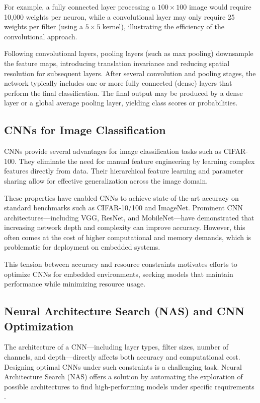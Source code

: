 For example, a fully connected layer processing a \(100 \times 100\) image would require 10,000 weights per neuron, while a convolutional layer may only require 25 weights per filter (using a \(5 \times 5\) kernel), illustrating the efficiency of the convolutional approach.

Following convolutional layers, pooling layers (such as max pooling) downsample the feature maps, introducing translation invariance and reducing spatial resolution for subsequent layers. After several convolution and pooling stages, the network typically includes one or more fully connected (dense) layers that perform the final classification. The final output may be produced by a dense layer or a global average pooling layer, yielding class scores or probabilities.

\subsection{CNNs for Image Classification}

CNNs provide several advantages for image classification tasks such as CIFAR-100. They eliminate the need for manual feature engineering by learning complex features directly from data. Their hierarchical feature learning and parameter sharing allow for effective generalization across the image domain.

These properties have enabled CNNs to achieve state-of-the-art accuracy on standard benchmarks such as CIFAR-10/100 and ImageNet. Prominent CNN architectures---including VGG, ResNet, and MobileNet---have demonstrated that increasing network depth and complexity can improve accuracy. However, this often comes at the cost of higher computational and memory demands, which is problematic for deployment on embedded systems.

This tension between accuracy and resource constraints motivates efforts to optimize CNNs for embedded environments, seeking models that maintain performance while minimizing resource usage.

\subsection{Neural Architecture Search (NAS) and CNN Optimization}

The architecture of a CNN---including layer types, filter sizes, number of channels, and depth---directly affects both accuracy and computational cost. Designing optimal CNNs under such constraints is a challenging task. Neural Architecture Search (NAS) offers a solution by automating the exploration of possible architectures to find high-performing models under specific requirements \cite{pau2023quantitative}.

